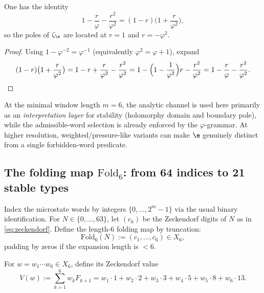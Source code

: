 \begin{lemma}\label{lem:golden_normalization_factorization}
One has the identity
\[
1-\frac{r}{\varphi}-\frac{r^2}{\varphi^2}=(1-r)\bigl(1+\frac{r}{\varphi^2}\bigr),
\]
so the poles of $\zeta_\e$ are located at $r=1$ and $r=-\varphi^{2}$.
\end{lemma}
\begin{proof}
Using $1-\varphi^{-2}=\varphi^{-1}$ (equivalently $\varphi^2=\varphi+1$), expand
\[
(1-r)\bigl(1+\frac{r}{\varphi^2}\bigr)=1-r+\frac{r}{\varphi^2}-\frac{r^2}{\varphi^2}
=1-\Bigl(1-\frac{1}{\varphi^2}\Bigr)r-\frac{r^2}{\varphi^2}
=1-\frac{r}{\varphi}-\frac{r^2}{\varphi^2}.
\]
\end{proof}

\begin{remark}\label{rem:e_channel_distinct}
At the minimal window length $m=6$, the analytic channel is used here primarily as an \emph{interpretation layer} for stability (holomorphy domain and boundary pole), while the admissible-word selection is already enforced by the $\varphi$-grammar.
At higher resolution, weighted/pressure-like variants can make $\e$ genuinely distinct from a single forbidden-word predicate.
\end{remark}

\subsection{The folding map \texorpdfstring{$\mathrm{Fold}_6$}{Fold6}: from 64 indices to 21 stable types}
\label{subsec:fold6_map}

Index the microstate words by integers $\{0,\dots,2^m-1\}$ via the usual binary identification.
For $N\in\{0,\dots,63\}$, let $(c_k)$ be the Zeckendorf digits of $N$ as in \eqref{eq:zeckendorf}.
Define the length-$6$ folding map by truncation:
\begin{equation}\label{eq:fold6_def}
\mathrm{Fold}_6(N):=(c_1,\dots,c_6)\in X_6,
\end{equation}
padding by zeros if the expansion length is $<6$.

\begin{definition}\label{def:zeckendorf_value}
For $w=w_1\cdots w_6\in X_6$, define its Zeckendorf value
\begin{equation}\label{eq:Vw_def}
V(w):=\sum_{k=1}^{6} w_k F_{k+1}
=w_1\cdot 1+w_2\cdot 2+w_3\cdot 3+w_4\cdot 5+w_5\cdot 8+w_6\cdot 13.
\end{equation}
\end{definition}

